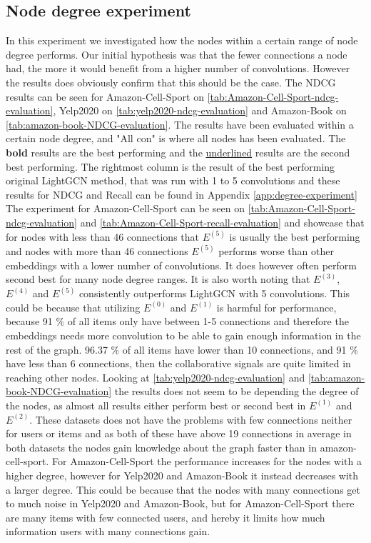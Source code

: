 \subsection{Node degree experiment}
In this experiment we investigated how the nodes within a certain range of node degree performs.
Our initial hypothesis was that the fewer connections a node had, the more it would benefit from a higher number of convolutions.
However the results does obviously confirm that this should be the case.
The NDCG results can be seen for Amazon-Cell-Sport on \autoref{tab:Amazon-Cell-Sport-ndcg-evaluation}, Yelp2020 on \autoref{tab:yelp2020-ndcg-evaluation} and Amazon-Book on \autoref{tab:amazon-book-NDCG-evaluation}.
The results have been evaluated within a certain node degree, and "All con" is where all nodes has been evaluated.
The \textbf{bold} results are the best performing and the \underline{underlined} results are the second best performing.
The rightmost column is the result of the best performing original LightGCN method, that was run with 1 to 5 convolutions and these results for NDCG and Recall can be found in Appendix \ref{app:degree-experiment}
The experiment for Amazon-Cell-Sport can be seen on \autoref{tab:Amazon-Cell-Sport-ndcg-evaluation} and \autoref{tab:Amazon-Cell-Sport-recall-evaluation} and showcase that for nodes with less than 46 connections that $E^{(5)}$ is usually the best performing and nodes with more than 46 connections $E^{(5)}$ performs worse than other embeddings with a lower number of convolutions.
It does however often perform second best for many node degree ranges.
It is also worth noting that $E^{(3)}$, $E^{(4)}$ and $E^{(5)}$ consistently outperforms LightGCN with 5 convolutions.
This could be because that utilizing $E^{(0)}$ and $E^{(1)}$ is harmful for performance, because 91 \% of all items only have between 1-5 connections and therefore the embeddings needs more convolution to be able to gain enough information in the rest of the graph.
96.37 \% of all items have lower than 10 connections, and 91 \% have less than 6 connections, then the collaborative signals are quite limited in reaching other nodes.
Looking at \autoref{tab:yelp2020-ndcg-evaluation} and \autoref{tab:amazon-book-NDCG-evaluation} the results does not seem to be depending the degree of the nodes, as almost all results either perform best or second best in $E^{(1)}$ and $E^{(2)}$.
These datasets does not have the problems with few connections neither for users or items and as both of these have above 19 connections in average in both datasets the nodes gain knowledge about the graph faster than in amazon-cell-sport.
For Amazon-Cell-Sport the performance increases for the nodes with a higher degree, however for Yelp2020 and Amazon-Book it instead decreases with a larger degree.
This could be because that the nodes with many connections get to much noise in Yelp2020 and Amazon-Book, but for Amazon-Cell-Sport there are many items with few connected users, and hereby it limits how much information users with many connections gain.

